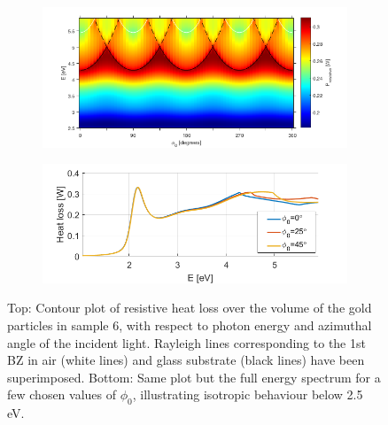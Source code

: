 \begin{figure}[h!]  %
    \begin{subfigure}{\textwidth}
        \centering
        \includegraphics[width=\linewidth, trim=0cm 0cm 0cm 0cm, clip]{figures/ch4/S6/contour/S6_HeatLoss_contour(1).png}
    \end{subfigure}
    
    \begin{subfigure}{\textwidth}
        \centering
        \includegraphics[width=0.8\linewidth, trim=0cm 0cm 0cm 0cm, clip]{figures/ch4/S6/contour/S6_HeatLoss_phi=0,25,45.png}
    \end{subfigure}
    
    \caption{Top: Contour plot of resistive heat loss over the volume of the gold particles in sample 6, with respect to photon energy and azimuthal angle of the incident light. Rayleigh lines corresponding to the 1st BZ in air (white lines) and glass substrate (black lines) have been superimposed. Bottom: Same plot but the full energy spectrum for a few chosen values of $\phi_0$, illustrating isotropic behaviour below 2.5 eV.}
    \label{fig:S6_heatloss}
\end{figure}

